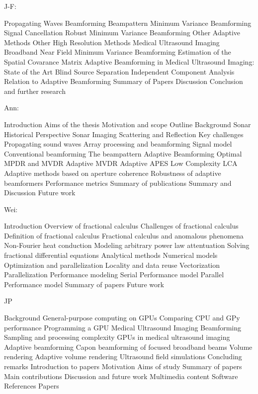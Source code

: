    
J-F:

Propagating Waves
Beamforming
  Beampattern
Minimum Variance Beamforming
  Signal Cancellation
  Robust Minimum Variance Beamforming
  Other Adaptive Methods
  Other High Resolution Methods
Medical Ultrasound Imaging
  Broadband Near Field Minimum Variance Beamforming
  Estimation of the Spatial Covarance Matrix
Adaptive Beamforming in Medical Ultrasound Imaging: State of the Art
Blind Source Separation
  Independent Component Analysis
  Relation to Adaptive Beamforming
Summary  of Papers
Discussion
Conclusion and further research

Ann:

Introduction
   Aims of the thesis
   Motivation and scope
   Outline
Background
   Sonar
      Historical Perspective
      Sonar Imaging
      Scattering and Reflection
      Key challenges
   Propagating sound waves
   Array processing and beamforming
      Signal model
      Conventional beamforming
      The beampattern
   Adaptive Beamforming
      Optimal MPDR and MVDR
      Adaptive MVDR
      Adaptive APES
      Low Complexity LCA
      Adaptive methods based on aperture coherence
      Robustness of adaptive beamformers
   Performance metrics
Summary of publications
Summary and Discussion
Future work

Wei:

Introduction
   Overview of fractional calculus
   Challenges of fractional calculus
   Definition of fractional calculus
   Fractional calculus and anomalous phenomena
      Non-Fourier heat conduction
      Modeling arbitrary power law attentuation
   Solving fractional differential equations
      Analytical methods
      Numerical models
   Optimization and parallelization
      Locality and data reuse
      Vectorization
      Parallelization
   Performance modeling
      Serial Performance model
      Parallel Performance model
Summary of papers
Future work
   
   
JP

Background
   General-purpose computing on GPUs
      Comparing CPU and GPy performance
      Programming a GPU
   Medical Ultrasound Imaging
      Beamforming
      Sampling and processing complexity
      GPUs in medical ultrasound imaging
      Adaptive beamforming
      Capon beamforming of focused broadband beams
   Volume rendering
      Adaptive volume rendering
   Ultrasound field simulations
   Concluding remarks
Introduction to papers
   Motivation
   Aims of study
   Summary of papers
   Main contributions
   Discussion and future work
   Multimedia content
   Software
References
Papers



